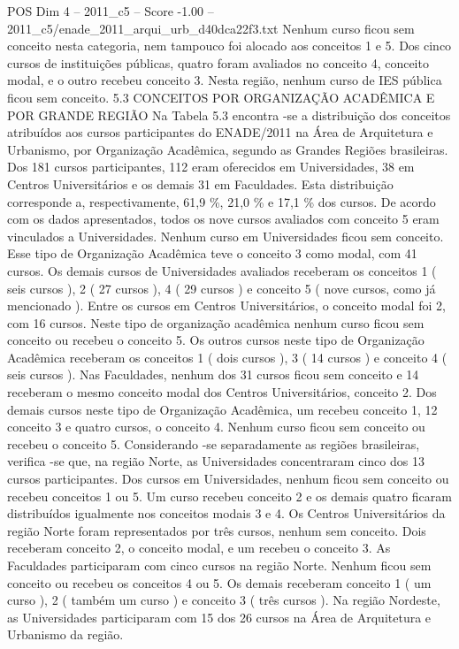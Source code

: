 \begin{textsample}{POS Dim 4 – 2011\_c5 – Score -1.00 – 2011\_c5/enade\_2011\_arqui\_urb\_d40dca22f3.txt}
Nenhum curso ficou sem conceito nesta categoria, nem tampouco foi alocado aos conceitos 1 e 5.
Dos cinco cursos de instituições públicas, quatro foram avaliados no conceito 4, conceito modal, e o outro recebeu conceito 3.
Nesta região, nenhum curso de IES pública ficou sem conceito. 5.3 CONCEITOS POR ORGANIZAÇÃO ACADÊMICA E POR GRANDE REGIÃO Na Tabela 5.3 encontra -se a distribuição dos conceitos atribuídos aos cursos participantes do ENADE/2011 na Área de Arquitetura e Urbanismo, por Organização Acadêmica, segundo as Grandes Regiões brasileiras.
Dos 181 cursos participantes, 112 eram oferecidos em Universidades, 38 em Centros Universitários e os demais 31 em Faculdades.
Esta distribuição corresponde a, respectivamente, 61,9 \%, 21,0 \% e 17,1 \% dos cursos.
De acordo com os dados apresentados, todos os nove cursos avaliados com conceito 5 eram vinculados a Universidades.
Nenhum curso em Universidades ficou sem conceito.
Esse tipo de Organização Acadêmica teve o conceito 3 como modal, com 41 cursos.
Os demais cursos de Universidades avaliados receberam os conceitos 1 ( seis cursos ), 2 ( 27 cursos ), 4 ( 29 cursos ) e conceito 5 ( nove cursos, como já mencionado ).
Entre os cursos em Centros Universitários, o conceito modal foi 2, com 16 cursos.
Neste tipo de organização acadêmica nenhum curso ficou sem conceito ou recebeu o conceito 5.
Os outros cursos neste tipo de Organização Acadêmica receberam os conceitos 1 ( dois cursos ), 3 ( 14 cursos ) e conceito 4 ( seis cursos ).
Nas Faculdades, nenhum dos 31 cursos ficou sem conceito e 14 receberam o mesmo conceito modal dos Centros Universitários, conceito 2.
Dos demais cursos neste tipo de Organização Acadêmica, um recebeu conceito 1, 12 conceito 3 e quatro cursos, o conceito 4.
Nenhum curso ficou sem conceito ou recebeu o conceito 5.
Considerando -se separadamente as regiões brasileiras, verifica -se que, na região Norte, as Universidades concentraram cinco dos 13 cursos participantes.
Dos cursos em Universidades, nenhum ficou sem conceito ou recebeu conceitos 1 ou 5.
Um curso recebeu conceito 2 e os demais quatro ficaram distribuídos igualmente nos conceitos modais 3 e 4.
Os Centros Universitários da região Norte foram representados por três cursos, nenhum sem conceito.
Dois receberam conceito 2, o conceito modal, e um recebeu o conceito 3.
As Faculdades participaram com cinco cursos na região Norte.
Nenhum ficou sem conceito ou recebeu os conceitos 4 ou 5.
Os demais receberam conceito 1 ( um curso ), 2 ( também um curso ) e conceito 3 ( três cursos ).
Na região Nordeste, as Universidades participaram com 15 dos 26 cursos na Área de Arquitetura e Urbanismo da região.

\end{textsample}
